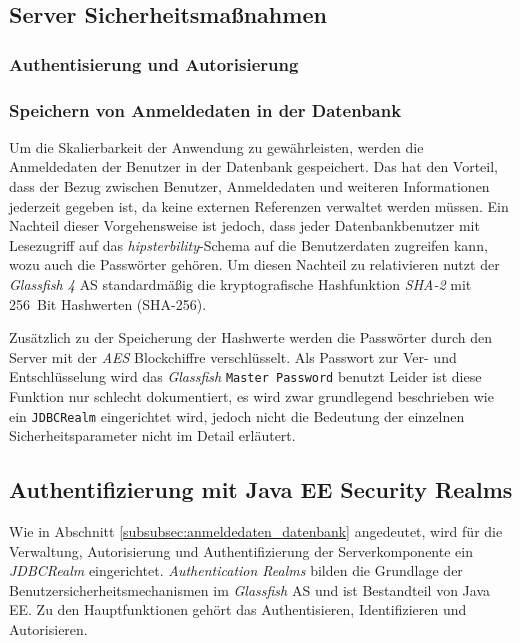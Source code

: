\subsection{Server Sicherheitsmaßnahmen}


\subsubsection{Authentisierung und Autorisierung}



\subsubsection{Speichern von Anmeldedaten in der Datenbank\label{subsubsec:anmeldedaten_datenbank}}
Um die Skalierbarkeit der Anwendung zu gewährleisten, werden die Anmeldedaten der Benutzer in der Datenbank gespeichert.
Das hat den Vorteil, dass der Bezug zwischen Benutzer, Anmeldedaten und weiteren Informationen jederzeit gegeben ist, da keine externen Referenzen verwaltet werden müssen.
Ein Nachteil dieser Vorgehensweise ist jedoch, dass jeder Datenbankbenutzer mit Lesezugriff auf das \emph{hipsterbility}-Schema auf die Benutzerdaten zugreifen kann, wozu auch die Passwörter gehören.
Um diesen Nachteil zu relativieren nutzt der \emph{Glassfish 4} \ac{AS} standardmäßig die kryptografische Hashfunktion \emph{\ac{SHA}-2} mit 256~Bit Hashwerten (\ac{SHA}-256).

Zusätzlich zu der Speicherung der Hashwerte werden die Passwörter durch den Server mit der \emph{\ac{AES}} Blockchiffre verschlüsselt.
Als Passwort zur Ver- und Entschlüsselung wird das \emph{Glassfish} \texttt{Master Password} benutzt \cite[vgl.][16\psq]{OracleCorporation.2013}
Leider ist diese Funktion nur schlecht dokumentiert, es wird zwar grundlegend beschrieben wie ein \texttt{JDBCRealm} eingerichtet wird, jedoch nicht die Bedeutung der einzelnen Sicherheitsparameter \cite[vgl.][50\psq]{OracleCorporation.2013} nicht im Detail erläutert.

\subsection{Authentifizierung mit Java EE Security Realms}
Wie in Abschnitt \ref{subsubsec:anmeldedaten_datenbank} angedeutet, wird für die Verwaltung, Autorisierung und Authentifizierung der Serverkomponente ein \emph{JDBCRealm} eingerichtet.
\emph{Authentication Realms} bilden die Grundlage der Benutzersicherheitsmechanismen im \emph{Glassfish} \ac{AS} und ist Bestandteil von Java EE.
Zu den Hauptfunktionen gehört das Authentisieren, Identifizieren und Autorisieren.

